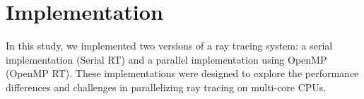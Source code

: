 \section{Implementation}
\label{sec:implementation}

In this study, we implemented two versions of a ray tracing system: a serial implementation (Serial RT) and a parallel implementation using OpenMP (OpenMP RT). These implementations were designed to explore the performance differences and challenges in parallelizing ray tracing on multi-core CPUs.



\FloatBarrier


\begin{comment}

\begin{itemize}
    \item Another way to look at this section is as a paper, within a paper, describing your implementation. That viewpoint makes this the introduction to the subordinate paper, which should describe the overall structure of your implementation and how it is designed to address the problem effectively.
\item Then, describe the structure of the rest of this section, and what each subsection describes.
\end{itemize}

How our solution (will | does) work
\begin{itemize}
    \item This is the body of the subordinate paper describing your solution. It may be divided into several subsections as required by the nature of your implementation.
    \item The level of detail about how the solution works is determined by what is appropriate to the type of paper (conference, journal, technical report).
    \item This section can be fairly short for conference papers, fairly long for journal papers, or quite long in technical reports. It all depends on the purpose of the paper and the target audience.
    \item Proposals are necessarily a good deal more vague in this section since you have to convince someone you know enough to have a good chance of building a solution, but that you have not already done so.
\end{itemize}

\end{comment}
